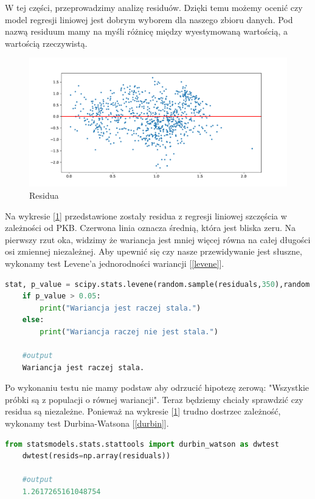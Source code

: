 \documentclass{article}
\theoremstyle{break}
\begin{document}
W tej części, przeprowadzimy analizę residuów. Dzięki temu możemy ocenić czy model regresji liniowej jest dobrym wyborem dla naszego zbioru danych. Pod nazwą residuum mamy na myśli różnicę między wyestymowaną wartością, a wartością rzeczywistą.

\begin{figure}[H]
	\begin{center}
		\includegraphics[scale=0.5]{res.pdf}
		\caption{Residua}
		\label{fig:res}
	\end{center}
\end{figure}

Na wykresie [\ref{fig:res}] przedstawione zostały residua z regresji liniowej szczęścia w zależności od PKB. Czerwona linia oznacza średnią, która jest bliska zeru. Na pierwszy rzut oka, widzimy że wariancja jest mniej więcej równa na całej długości osi zmiennej niezależnej. Aby upewnić się czy nasze przewidywanie jest słuszne, wykonamy test Levene'a jednorodności wariancji [\ref{levene}]. 

\begin{lstlisting}[language=Python, caption=Test Levene'a, label={levene}]
	stat, p_value = scipy.stats.levene(random.sample(residuals,350),random.sample(residuals,350))
	if p_value > 0.05:
		print("Wariancja jest raczej stala.")
	else:
		print("Wariancja raczej nie jest stala.")
		
	#output
	Wariancja jest raczej stala.
\end{lstlisting}

Po wykonaniu testu nie mamy podstaw aby odrzucić hipotezę zerową: "Wszystkie próbki są z populacji o równej wariancji". Teraz będziemy chciały sprawdzić czy residua są niezależne. Ponieważ na wykresie [\ref{fig:res}] trudno dostrzec zależność, wykonamy test Durbina-Watsona [\ref{durbin}].

\begin{lstlisting}[language=Python, caption=Test Levene'a, label={durbin}]
	from statsmodels.stats.stattools import durbin_watson as dwtest
	dwtest(resids=np.array(residuals))
	
	#output
	1.2617265161048754
\end{lstlisting}
\end{document}
